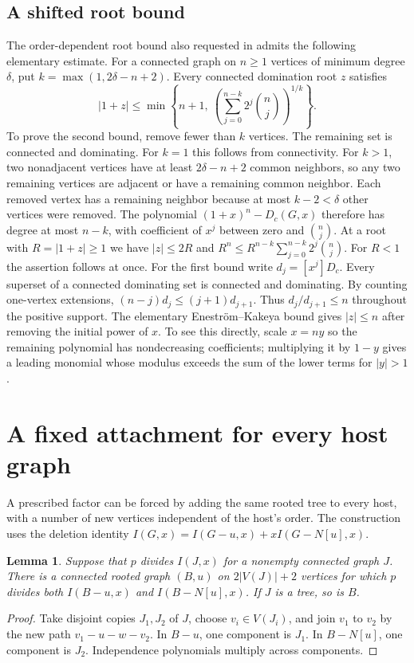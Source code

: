 \documentclass[11pt,a4paper]{article}
\newtheorem{lemma}[theorem]{Lemma}
\begin{document}
\subsection{A shifted root bound}
The order-dependent root bound also requested in \cite[Open Problem~4]{shao}
admits the following elementary estimate. For a connected graph on $n\ge1$
vertices of minimum degree $\delta$, put $k=\max(1,2\delta-n+2)$. Every
connected domination root $z$ satisfies
\[
 |1+z|\le
 \min\left\{n+1,\
  \left(\sum_{j=0}^{n-k}2^j\binom nj\right)^{1/k}\right\}.
\]
To prove the second bound, remove fewer than $k$ vertices. The remaining
set is connected and dominating. For $k=1$ this follows from connectivity.
For $k>1$, two nonadjacent vertices have at least $2\delta-n+2$ common
neighbors, so any two remaining vertices are adjacent or have a remaining
common neighbor. Each removed vertex has a remaining neighbor because
at most $k-2<\delta$ other vertices were removed. The polynomial
$(1+x)^n-D_c(G,x)$ therefore has degree at most $n-k$, with coefficient
of $x^j$ between zero and $\binom nj$. At a root with $R=|1+z|\ge1$
we have $|z|\le2R$ and
$R^n\le R^{n-k}\sum_{j=0}^{n-k}2^j\binom nj$.
For $R<1$ the assertion follows at once.
For the first bound write $d_j=[x^j]D_c$. Every superset of a connected
dominating set is connected and dominating. By counting one-vertex
extensions, $(n-j)d_j\le(j+1)d_{j+1}$. Thus $d_j/d_{j+1}\le n$
throughout the positive support. The elementary Enestr\"om--Kakeya
bound gives $|z|\le n$ after removing the initial power of $x$. To see
this directly, scale $x=ny$ so the remaining polynomial has nondecreasing
coefficients; multiplying it by $1-y$ gives a leading monomial whose
modulus exceeds the sum of the lower terms for $|y|>1$.

\section{A fixed attachment for every host graph}
\label{sec:fixed-attachment}

A prescribed factor can be forced by adding the same rooted tree to every
host, with a number of new vertices independent of the host's order.
The construction uses the deletion identity
$I(G,x)=I(G-u,x)+xI(G-N[u],x)$.

\begin{lemma}\label{lem:attachment}
Suppose that $p$ divides $I(J,x)$ for a nonempty connected graph $J$.
There is a connected rooted graph $(B,u)$ on $2|V(J)|+2$ vertices for
which $p$ divides both $I(B-u,x)$ and $I(B-N[u],x)$. If $J$ is a tree,
so is $B$.
\end{lemma}
\begin{proof}
Take disjoint copies $J_1,J_2$ of $J$, choose $v_i\in V(J_i)$, and
join $v_1$ to $v_2$ by the new path $v_1-u-w-v_2$.
In $B-u$, one component is $J_1$. In $B-N[u]$, one component is $J_2$.
Independence polynomials multiply across components.
\end{proof}
\end{document}
